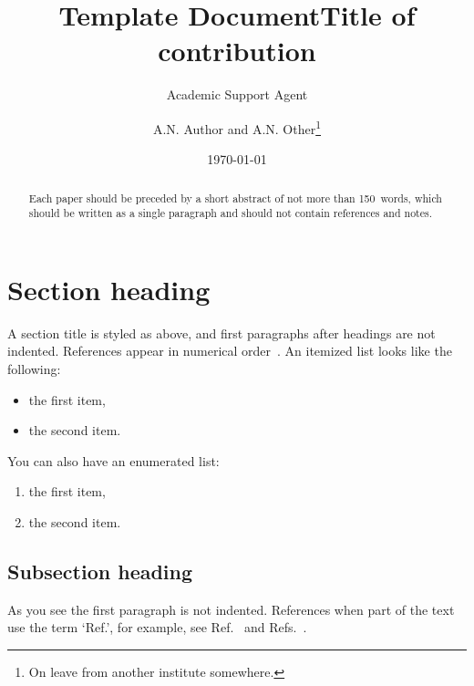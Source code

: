\documentclass{article}
\title{Template Document}
\author{Academic Support Agent}
\date{\today}
\begin{document}
\maketitle

\title{Title of contribution}
\author{A.N. Author and A.N. Other\thanks
                 {On leave from another institute somewhere.}}


\begin{abstract}
Each paper should be preceded by a short abstract of not more 
than 150~words, which should be written as a single paragraph 
and should not contain references and notes.
\end{abstract}


\maketitle

\section{Section heading}

A section title is styled as above, and first paragraphs after
headings are not indented. References appear in numerical
order~\cite{Raby1966,Dupont1961}. An itemized list looks like the following:
\begin{itemize}
\item the first item,
\item the second item.
\end{itemize}

You can also have an enumerated list:

\begin{enumerate}
\item the first item,
\item the second item.
\end{enumerate}

\subsection{Subsection heading}

As you see the first paragraph is not indented. References when part
      of the text use the term `Ref.', for example, see
      Ref.~\cite{Raby1966} and
      Refs.~\cite{Appleman1959,vanBerg1965,Bryant1985,Allen1977}.
\end{document}
